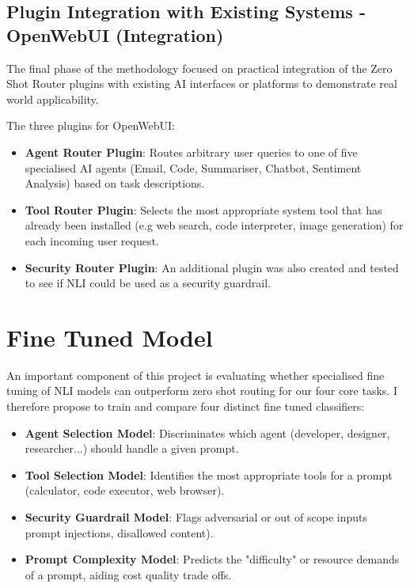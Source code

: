 \subsection{Plugin Integration with Existing Systems - OpenWebUI (Integration)}

The final phase of the methodology focused on practical integration of the Zero Shot Router plugins with existing AI interfaces or platforms to demonstrate real world applicability.

The three plugins for OpenWebUI:

\begin{itemize}
    \item \textbf{Agent Router Plugin}: Routes arbitrary user queries to one of five specialised AI agents (Email, Code, Summariser, Chatbot, Sentiment Analysis) based on task descriptions.
    \item \textbf{Tool Router Plugin}: Selects the most appropriate system tool that has already been installed (e.g web search, code interpreter, image generation) for each incoming user request.
    \item \textbf{Security Router Plugin}: An additional plugin was also created and tested to see if NLI could be used as a security guardrail.
\end{itemize}


\section{Fine Tuned Model}
\label{fine tuned model}
An important component of this project is evaluating whether specialised fine tuning of NLI models can outperform zero shot routing for our four core tasks. I therefore propose to train and compare four distinct fine tuned classifiers:

\begin{itemize}
    \item \textbf{Agent Selection Model}: Discriminates which agent (developer, designer, researcher...) should handle a given prompt.
    \item \textbf{Tool Selection Model}: Identifies the most appropriate tools for a prompt (calculator, code executor, web browser).
    \item \textbf{Security Guardrail Model}: Flags adversarial or out of scope inputs prompt injections, disallowed content).
    \item \textbf{Prompt Complexity Model}: Predicts the "difficulty" or resource demands of a prompt, aiding cost quality trade offs.
\end{itemize}

